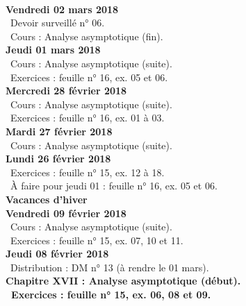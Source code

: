 \documentclass[12pt,a4paper]{article}
\begin{document}
\vspace{.4cm}\\ 

\noindent\textbf{Vendredi 02 mars 2018}\\
\bu\ Devoir surveillé n° 06.\\
\bu\ Cours : Analyse asymptotique (fin).\vspace{.4cm}\\

\noindent\textbf{Jeudi 01 mars 2018}\\
\bu\ Cours : Analyse asymptotique (suite).\\
\bu\ Exercices : feuille n° 16, ex. 05 et 06.\vspace{.4cm}\\

\noindent\textbf{Mercredi 28 février 2018} \\
\bu\ Cours : Analyse asymptotique (suite).\\
\bu\ Exercices : feuille n° 16, ex. 01 à 03.\vspace{.4cm}\\

\noindent\textbf{Mardi 27 février 2018} \\
\bu\ Cours : Analyse asymptotique (suite).\vspace{.4cm}\\

\noindent\textbf{\bf Lundi 26 février 2018} \\
\bu\ Exercices : feuille n° 15, ex. 12 à 18.\\
\bu\ À faire pour jeudi 01 : feuille n° 16, ex. 05 et 06.\vspace{.4cm}\\

\noindent\textbf{\bf Vacances d'hiver }\\

\noindent\textbf{Vendredi 09 février 2018}\\
\bu\ Cours : Analyse asymptotique (suite).\\
\bu\ Exercices : feuille n° 15, ex. 07, 10 et 11.\vspace{.4cm}\\

\noindent\textbf{Jeudi 08 février 2018}\\
\bu\ Distribution : DM n° 13 (à rendre le 01 mars).\\
\bf Chapitre XVII \rm : Analyse asymptotique (début).\\
\bu\ Exercices : feuille n° 15, ex. 06, 08 et 09.\vspace{.4cm}\\
\end{document}
